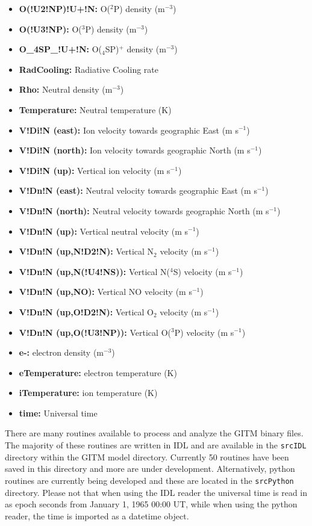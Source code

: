 \begin{itemize}
\item[]{\bf O(!U2!NP)!U+!N:} O($^2$P) density (m$^{-3}$)
\item[]{\bf O(!U3!NP):} O($^3$P) density (m$^{-3}$)
\item[]{\bf O\_4SP\_!U+!N:} O($_4$SP)$^+$ density (m$^{-3}$)
\item[]{\bf RadCooling:} Radiative Cooling rate
\item[]{\bf Rho:} Neutral density (m$^{-3}$)
\item[]{\bf Temperature:} Neutral temperature (K)
\item[]{\bf V!Di!N (east):} Ion velocity towards geographic East (m s$^{-1}$)
\item[]{\bf V!Di!N (north):} Ion velocity towards geographic North (m s$^{-1}$) 
\item[]{\bf V!Di!N (up):} Vertical ion velocity (m s$^{-1}$)
\item[]{\bf V!Dn!N (east):} Neutral velocity towards geographic East (m s$^{-1}$)
\item[]{\bf V!Dn!N (north):} Neutral velocity towards geographic North (m s$^{-1}$)
\item[]{\bf V!Dn!N (up):} Vertical neutral velocity (m s$^{-1}$)
\item[]{\bf V!Dn!N (up,N!D2!N):} Vertical N$_2$ velocity (m s$^{-1}$)
\item[]{\bf V!Dn!N (up,N(!U4!NS)):} Vertical N($^4$S) velocity (m s$^{-1}$)
\item[]{\bf V!Dn!N (up,NO):} Vertical NO velocity (m s$^{-1}$)
\item[]{\bf V!Dn!N (up,O!D2!N):} Vertical O$_2$ velocity (m s$^{-1}$)
\item[]{\bf V!Dn!N (up,O(!U3!NP)):} Vertical O($^3$P) velocity (m s$^{-1}$)
\item[]{\bf e-:} electron density (m$^{-3}$)
\item[]{\bf eTemperature:} electron temperature (K)
\item[]{\bf iTemperature:} ion temperature (K)
\item[]{\bf time:} Universal time
\end{itemize}

There are many routines available to process and analyze the GITM binary files.  The majority of these routines are written in IDL and are available in the {\tt srcIDL} directory within the GITM model directory.  Currently 50 routines have been saved in this directory and more are under development.  Alternatively, python routines are currently being developed and these are located in the {\tt srcPython} directory.  Please not that when using the IDL reader the universal time is read in as epoch seconds from January 1, 1965 00:00 UT, while when using the python reader, the time is imported as a datetime object.

